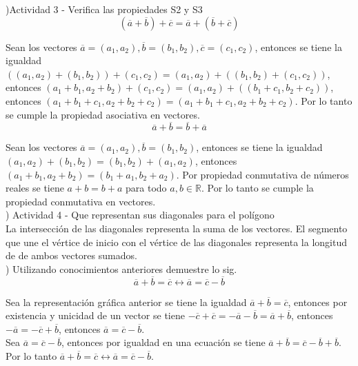 \documentclass[11pt,a4paper]{article}
\begin{document}
\begin{justify}


)Actividad 3 - Verifica las propiedades S2 y S3\\

$$(\overline{a}+\overline{b})+\overline{c} = \overline{a} + (\overline{b}+\overline{c})$$

Sean los vectores $\overline{a} = (a_1, a_2), \overline{b} = (b_1, b_2), \overline{c} = (c_1, c_2)$, entonces se tiene la igualdad $((a_1, a_2)+(b_1, b_2))+(c_1, c_2) = (a_1, a_2) + ((b_1, b_2)+(c_1, c_2)) $, entonces $(a_1+b_1, a_2+b_2)+(c_1, c_2) = (a_1, a_2) + ((b_1+c_1, b_2+c_2))$, entonces $(a_1+b_1+c_1, a_2+b_2+c_2)= (a_1+b_1+c_1, a_2+b_2+c_2)$. Por lo tanto se cumple la propiedad asociativa en vectores.\\

$$ \overline{a}+\overline{b} = \overline{b}+\overline{a} $$

Sean los vectores $\overline{a} = (a_1, a_2), \overline{b} = (b_1, b_2) $, entonces se tiene la igualdad $(a_1,a_2)+(b_1,b_2)=(b_1, b_2)+(a_1, a_2)$, entonces $(a_1+b_1,a_2+b_2)=(b_1+a_1, b_2+a_2)$. Por propiedad conmutativa de números reales se tiene $a+b = b+a $ para todo $ a,b \in \mathbb{R}$. Por lo tanto se cumple la propiedad conmutativa en vectores.\\

) Actividad 4 - Que representan sus diagonales para el polígono\\

\noindent
La intersección de las diagonales representa la suma de los vectores. El segmento que une el vértice de inicio con el vértice de las diagonales representa la longitud de de ambos vectores sumados.\\

) Utilizando conocimientos anteriores demuestre lo sig.\\

$$ \overline{a}+\overline{b} = \overline{c} \leftrightarrow \overline{a} = \overline{c}-\overline{b} $$

Sea la representación gráfica anterior se tiene la igualdad $\overline{a}+\overline{b} = \overline{c}$, entonces por existencia y unicidad de un vector se tiene $-\overline{c} +\overline{c}= -\overline{a}-\overline{b}= \overline{a}+\overline{b}$, entonces $-\overline{a} = -\overline{c}+\overline{b}$, entonces $\overline{a}=  \overline{c}-\overline{b}$.\\

Sea $\overline{a} = \overline{c}-\overline{b}$, entonces por igualdad en una ecuación se tiene $\overline{a}+\overline{b} = \overline{c}-\overline{b}+\overline{b}$. Por lo tanto $\overline{a}+\overline{b} = \overline{c} \leftrightarrow \overline{a} = \overline{c}-\overline{b}$.\\


\end{justify}
\end{document}
